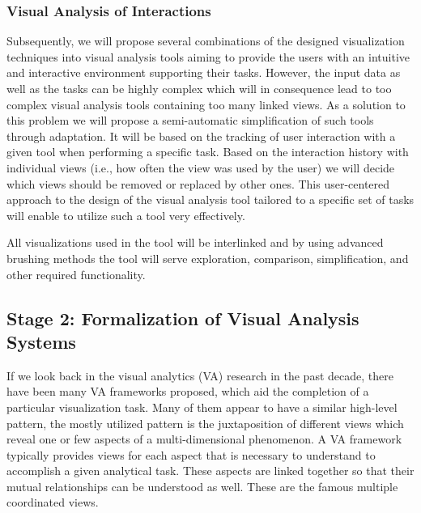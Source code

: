 \documentclass[11pt,a4paper,titlepage,oneside,onecolumn]{article}
\begin{document}

\subsubsection{Visual Analysis of Interactions}
\vspace{-4mm}
Subsequently, we will propose several combinations of the designed visualization techniques into visual analysis tools aiming to provide the users with an intuitive and interactive environment supporting their tasks.
However, the input data as well as the tasks can be highly complex which will in consequence lead to too complex visual analysis tools containing too many linked views.
As a solution to this problem we will propose a semi-automatic simplification of such tools through adaptation.
It will be based on the tracking of user interaction with a given tool when performing a specific task.
Based on the interaction history with individual views (i.e., how often the view was used by the user) we will decide which views should be removed or replaced by other ones. 
This user-centered approach to the design of the visual analysis tool tailored to a specific set of tasks will enable to utilize such a tool very effectively.

All visualizations used in the tool will be interlinked and by using advanced brushing methods the tool will serve exploration, comparison, simplification, and other required functionality.



\subsection{Stage 2: Formalization of Visual Analysis Systems}
If we look back in the visual analytics (VA) research in the past decade, there have been many VA frameworks proposed, which aid the completion of a particular visualization task. Many of them appear to have a similar high-level pattern, the mostly utilized pattern is the juxtaposition of different views which reveal one or few aspects of a multi-dimensional phenomenon. A VA framework typically provides views for each aspect that is necessary to understand to accomplish a given analytical task. These aspects are linked together so that their mutual relationships can be understood as well. These are the famous multiple coordinated views.
\end{document}
